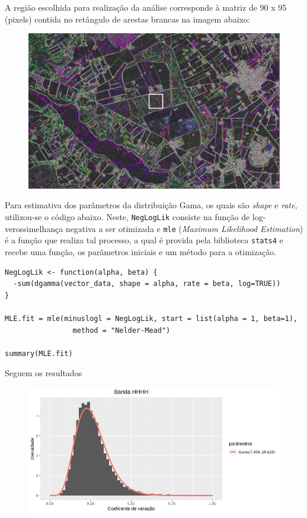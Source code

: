\documentclass[12pt]{article}
\begin{document}
A região escolhida para realização da análise corresponde à matriz de 90 x 95 (pixels) contida no retângulo de arestas brancas na imagem abaixo:

\begin{figure}[!ht]
    \centering
    \includegraphics[scale = 0.65]{../../Images/Report_18_09_17/region.png}
\end{figure}
\newpage
Para estimativa dos parâmetros da distribuição Gama, os quais são \textit{shape} e \textit{rate}, utilizou-se o código abaixo. Neste, \texttt{NegLogLik} consiste na função de log-verossimelhança negativa a ser otimizada e \texttt{mle} (\textit{Maximum Likelihood Estimation}) é a função que realiza tal processo, a qual é provida pela biblioteca \texttt{stats4} e recebe uma função, os parâmetros iniciais e um método para a otimização.

\begin{verbatim}
NegLogLik <- function(alpha, beta) {
  -sum(dgamma(vector_data, shape = alpha, rate = beta, log=TRUE))
}

MLE.fit = mle(minuslogl = NegLogLik, start = list(alpha = 1, beta=1), 
                method = "Nelder-Mead")

summary(MLE.fit)
\end{verbatim}
Seguem os resultados
\begin{figure}[!ht]
    \centering
    \includegraphics[scale = 0.75]{../../Images/Report_18_09_17/density_hhhh.jpeg}
\end{figure}
\end{document}
